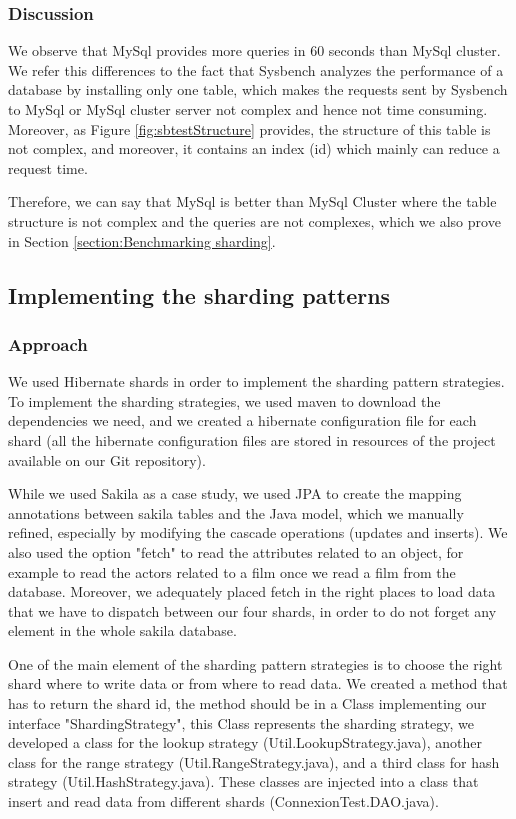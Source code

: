 \documentclass[10pt, conference]{IEEEtran}
\begin{document}
\subsubsection{Discussion} We observe that MySql provides more queries in 60 seconds than MySql cluster. We refer this differences to the fact that Sysbench analyzes the performance of a database by installing only one table, which makes the requests sent by Sysbench to MySql or MySql cluster server not complex and hence not time consuming. Moreover, as Figure \ref{fig:sbtestStructure} provides, the structure of this table is not complex, and moreover, it contains an index (id) which mainly can reduce a request time.

Therefore, we can say that MySql is better than MySql Cluster where the table structure is not complex and the queries are not complexes, which we also prove in Section \ref{section:Benchmarking sharding}.

\subsection{Implementing the sharding patterns}

\subsubsection{Approach} We used Hibernate shards in order to implement the sharding pattern strategies. To implement the sharding strategies, we used maven to download the dependencies we need, and we created a hibernate configuration file for each shard (all the hibernate configuration files are stored in resources of the project available on our Git repository). 

While we used Sakila as a case study, we used JPA to create the mapping annotations between sakila tables and the Java model, which we manually refined, especially by modifying the cascade operations (updates and inserts). We also used the option "fetch" to read the attributes related to an object, for example to read the actors related to a film once we read a film from the database. Moreover, we adequately placed fetch in the right places to load data that we have to dispatch between our four shards, in order to do not forget any element in the whole sakila database. 

One of the main element of the sharding pattern strategies is to choose the right shard where to write data or from where to read data. We created a method that has to return the shard id, the method should be in a Class implementing our interface "ShardingStrategy", this Class represents the sharding strategy, we developed a class for the lookup strategy (Util.LookupStrategy.java), another class for the range strategy (Util.RangeStrategy.java), and a third class for hash strategy (Util.HashStrategy.java). These classes are injected into a class that insert and read data from different shards (ConnexionTest.DAO.java).
\end{document}
